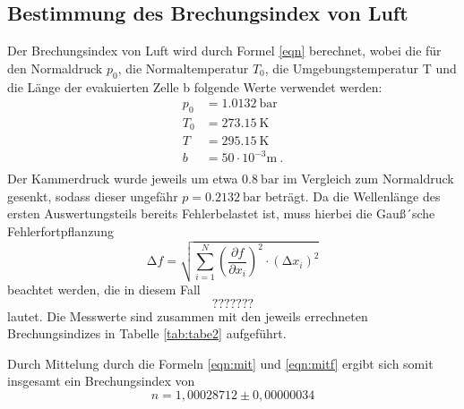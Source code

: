 \subsection{Bestimmung des Brechungsindex von Luft}
Der Brechungsindex von Luft wird durch Formel \ref{eqn} berechnet, wobei die für
den Normaldruck $p_0$, die Normaltemperatur $T_0$, die Umgebungstemperatur T und die
Länge der evakuierten Zelle b folgende Werte verwendet werden:
\begin{align*}
  p_0 &= \SI{1.0132}{\bar} \\
  T_0 &= \SI{273.15}{\kelvin} \\
  T &= \SI{295.15}{\kelvin} \\
  b &=  50 \cdot 10^{-3} \si{\meter} \: .\\
\end{align*}
Der Kammerdruck wurde jeweils um etwa $\SI{0.8}{\bar}$ im Vergleich zum Normaldruck
gesenkt, sodass dieser
ungefähr $ p = \SI{0.2132}{\bar}$ beträgt.
Da die Wellenlänge des ersten Auswertungsteils bereits Fehlerbelastet ist, muss
hierbei die Gauß´sche Fehlerfortpflanzung
\begin{equation}
  \increment f = \sqrt{ \sum_{i=1}^N \left( \frac{\partial f}{\partial x_i}\right)^2
  \cdot (\increment x_i)^2  }
  \label{eqn:gaus}
\end{equation}
beachtet werden, die in diesem Fall
\begin{equation}
  ???????
\end{equation}
lautet.
Die Messwerte sind zusammen mit den jeweils errechneten Brechungsindizes in Tabelle
\ref{tab:tabe2} aufgeführt.

Durch Mittelung durch die Formeln \ref{eqn:mit} und \ref{eqn:mitf} ergibt sich somit insgesamt
ein Brechungsindex von
\begin{equation*}
  n = 1,00028712 \pm 0,00000034
\end{equation*}
